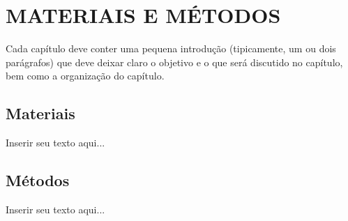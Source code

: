 
\chapter{MATERIAIS E MÉTODOS}
\label{chap:materiais_metodos}
Cada capítulo deve conter uma pequena introdução (tipicamente, um ou dois parágrafos) que deve deixar claro o objetivo e o que será discutido no capítulo, bem como a organização do capítulo.

\section{Materiais}
\label{sec:materiais}

Inserir seu texto aqui...

\section{Métodos}
\label{sec:metodos}

Inserir seu texto aqui...